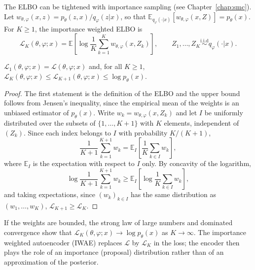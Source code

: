 \documentclass[english,graybox,envcountchap,envcountsame,sectrefs,shortlabels]{svmono}
\theoremstyle{style}
\newcommand{\iid}{\stackrel{\mathrm{i.i.d}}{\sim}}
\newcommand{\eqsp}{}
\begin{document}
The ELBO can be tightened with importance sampling (see Chapter~\ref{chap:smc}). Let $w_{\theta,\varphi}(x,z) = p_\theta(z,x)/q_\varphi(z|x)$, so that $\mathbb{E}_{q_\varphi(\cdot|x)}[w_{\theta,\varphi}(x,Z)] = p_\theta(x)$. For $K\geq1$, the importance weighted ELBO \cite{burda2016importance} is
$$
\mathcal{L}_K(\theta,\varphi;x) = \mathbb{E}\left[\log\frac1K\sum_{k=1}^Kw_{\theta,\varphi}(x,Z_k)\right]\eqsp,\qquad Z_1,\ldots,Z_K\iid q_\varphi(\cdot|x)\eqsp.
$$
\begin{proposition}
\label{prop:iwae}
$\mathcal{L}_1(\theta,\varphi;x) = \mathcal{L}(\theta,\varphi;x)$ and, for all $K\geq1$, $\mathcal{L}_K(\theta,\varphi;x)\leq\mathcal{L}_{K+1}(\theta,\varphi;x)\leq\log p_\theta(x)$.
\end{proposition}
\begin{proof}
The first statement is the definition of the ELBO and the upper bound follows from Jensen's inequality, since the empirical mean of the weights is an unbiased estimator of $p_\theta(x)$. Write $w_k = w_{\theta,\varphi}(x,Z_k)$ and let $I$ be uniformly distributed over the subsets of $\{1,\ldots,K+1\}$ with $K$ elements, independent of $(Z_k)$. Since each index belongs to $I$ with probability $K/(K+1)$,
$$
\frac{1}{K+1}\sum_{k=1}^{K+1}w_k = \mathbb{E}_I\left[\frac{1}{K}\sum_{k\in I}w_k\right]\eqsp,
$$
where $\mathbb{E}_I$ is the expectation with respect to $I$ only. By concavity of the logarithm,
$$
\log\frac{1}{K+1}\sum_{k=1}^{K+1}w_k\geq\mathbb{E}_I\left[\log\frac{1}{K}\sum_{k\in I}w_k\right]\eqsp,
$$
and taking expectations, since $(w_k)_{k\in I}$ has the same distribution as $(w_1,\ldots,w_K)$, $\mathcal{L}_{K+1}\geq\mathcal{L}_K$.
\end{proof}
If the weights are bounded, the strong law of large numbers and dominated convergence show that $\mathcal{L}_K(\theta,\varphi;x)\to\log p_\theta(x)$ as $K\to\infty$. The importance weighted autoencoder (IWAE) replaces $\mathcal{L}$ by $\mathcal{L}_K$ in the loss; the encoder then plays the role of an importance (proposal) distribution rather than of an approximation of the posterior.
\end{document}
